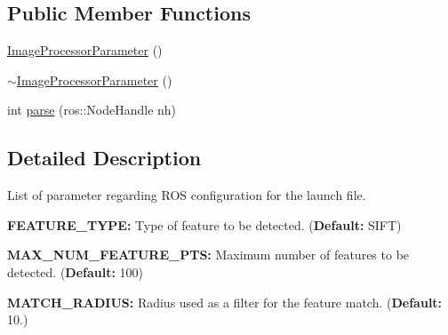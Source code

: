 \subsection*{\-Public \-Member \-Functions}
\begin{DoxyCompactItemize}
\item 
\hyperlink{classLRM_1_1ImageProcessorParameter_a83fe9807e1480dc000041f5c460b39af}{\-Image\-Processor\-Parameter} ()
\item 
\hyperlink{classLRM_1_1ImageProcessorParameter_ae384a255c8688ef911db3499a773c65b}{$\sim$\-Image\-Processor\-Parameter} ()
\item 
int \hyperlink{classLRM_1_1ImageProcessorParameter_a381448a39d6b41c8f44fd5b45f975b4a}{parse} (ros\-::\-Node\-Handle nh)
\end{DoxyCompactItemize}


\subsection{\-Detailed \-Description}
\-List of parameter regarding \-R\-O\-S configuration for the launch file.
\begin{DoxyItemize}
\item {\bfseries \-F\-E\-A\-T\-U\-R\-E\-\_\-\-T\-Y\-P\-E\-:} \-Type of feature to be detected. ({\bfseries \-Default\-:} \-S\-I\-F\-T)
\item {\bfseries \-M\-A\-X\-\_\-\-N\-U\-M\-\_\-\-F\-E\-A\-T\-U\-R\-E\-\_\-\-P\-T\-S\-:} \-Maximum number of features to be detected. ({\bfseries \-Default\-:} 100)
\item {\bfseries \-M\-A\-T\-C\-H\-\_\-\-R\-A\-D\-I\-U\-S\-:} \-Radius used as a filter for the feature match. ({\bfseries \-Default\-:} 10.) 
\end{DoxyItemize}

